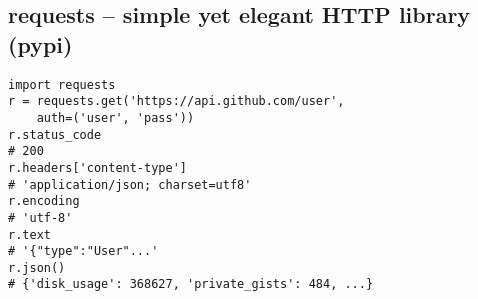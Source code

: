\subsection{requests -- simple yet elegant HTTP library (pypi)}
\begin{verbatim}
import requests
r = requests.get('https://api.github.com/user',
    auth=('user', 'pass'))
r.status_code
# 200
r.headers['content-type']
# 'application/json; charset=utf8'
r.encoding
# 'utf-8'
r.text
# '{"type":"User"...'
r.json()
# {'disk_usage': 368627, 'private_gists': 484, ...}
\end{verbatim}